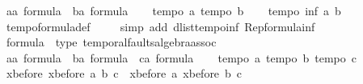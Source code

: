 \begin{isabellebody}
\ a{\isacharcolon}{\isacharcolon}{\isachardoublequoteopen}{\isacharprime}a\ formula{\isachardoublequoteclose}\ \ b{\isacharcolon}{\isacharcolon}{\isachardoublequoteopen}{\isacharprime}a\ formula{\isachardoublequoteclose}\isanewline
\ \ \isamarkupfalse%
\ {\isachardoublequoteopen}tempo{}\ a{\isachardoublequoteclose}\ {\isachardoublequoteopen}tempo{}\ b{\isachardoublequoteclose}\isanewline
\ \ \isamarkupfalse%
\ {\isachardoublequoteopen}tempo{}\ {\isacharparenleft}inf\ a\ b{\isacharparenright}{\isachardoublequoteclose}\isanewline
\ \ \isamarkupfalse%
\ tempo{}{\isacharunderscore}formula{\isacharunderscore}def\ \isanewline
\ \ \isamarkupfalse%
\ {\isacharparenleft}simp\ add{\isacharcolon}\ dlist{\isacharunderscore}tempo{}{\isacharunderscore}inf\ Rep{\isacharunderscore}formula{\isacharunderscore}inf{\isacharparenright}\isanewline
{}\isamarkupfalse%
%
\endisatagproof
{\isafoldproof}%
%
\isadelimproof
%
\endisadelimproof
\isanewline
\isanewline
{}\isamarkupfalse%
%
\isamarkuptrue%
\isamarkupfalse%
\ formula\ {\isacharcolon}{\isacharcolon}\ {\isacharparenleft}type{\isacharparenright}\ temporal{\isacharunderscore}faults{\isacharunderscore}algebra{\isacharunderscore}assoc\isanewline
{}\isanewline
\isanewline
{}\isamarkupfalse%
%
\isadelimproof
\ %
\endisadelimproof
%
\isatagproof
{}\isamarkupfalse%
\isanewline
\ \ \isamarkupfalse%
\ a{\isacharcolon}{\isacharcolon}{\isachardoublequoteopen}{\isacharprime}a\ formula{\isachardoublequoteclose}\ \ b{\isacharcolon}{\isacharcolon}{\isachardoublequoteopen}{\isacharprime}a\ formula{\isachardoublequoteclose}\ \ c{\isacharcolon}{\isacharcolon}{\isachardoublequoteopen}{\isacharprime}a\ formula{\isachardoublequoteclose}\isanewline
\ \ \isamarkupfalse%
\ {\isachardoublequoteopen}tempo{}\ a{\isachardoublequoteclose}\ {\isachardoublequoteopen}tempo{}\ b{\isachardoublequoteclose}\ {\isachardoublequoteopen}tempo{}\ c{\isachardoublequoteclose}\isanewline
\ \ \isamarkupfalse%
\ {\isachardoublequoteopen}xbefore\ {\isacharparenleft}xbefore\ a\ b{\isacharparenright}\ c\ {\isacharequal}\ xbefore\ a\ {\isacharparenleft}xbefore\ b\ c{\isacharparenright}{\isachardoublequoteclose}\isanewline
\ \ \isamarkupfalse%

\end{isabellebody}

